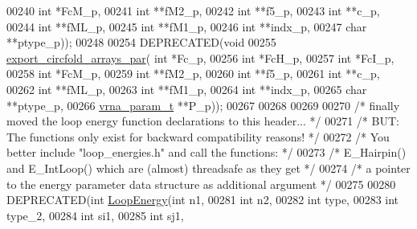 \begin{DoxyCode}
00240                         \textcolor{keywordtype}{int} *FcM\_p,
00241                         \textcolor{keywordtype}{int} **fM2\_p,
00242                         \textcolor{keywordtype}{int} **f5\_p,
00243                         \textcolor{keywordtype}{int} **c\_p,
00244                         \textcolor{keywordtype}{int} **fML\_p,
00245                         \textcolor{keywordtype}{int} **fM1\_p,
00246                         \textcolor{keywordtype}{int} **indx\_p,
00247                         \textcolor{keywordtype}{char} **ptype\_p));
00248 
00254 DEPRECATED(\textcolor{keywordtype}{void}
00255 \hyperlink{group__mfe__fold__single_ga004bb901e7fd2f8d5ae68f9530318ce1}{export\_circfold\_arrays\_par}( \textcolor{keywordtype}{int} *Fc\_p,
00256                             \textcolor{keywordtype}{int} *FcH\_p,
00257                             \textcolor{keywordtype}{int} *FcI\_p,
00258                             \textcolor{keywordtype}{int} *FcM\_p,
00259                             \textcolor{keywordtype}{int} **fM2\_p,
00260                             \textcolor{keywordtype}{int} **f5\_p,
00261                             \textcolor{keywordtype}{int} **c\_p,
00262                             \textcolor{keywordtype}{int} **fML\_p,
00263                             \textcolor{keywordtype}{int} **fM1\_p,
00264                             \textcolor{keywordtype}{int} **indx\_p,
00265                             \textcolor{keywordtype}{char} **ptype\_p,
00266                             \hyperlink{group__energy__parameters_structvrna__param__s}{vrna\_param\_t} **P\_p));
00267 
00268 
00269 
00270 \textcolor{comment}{/* finally moved the loop energy function declarations to this header...  */}
00271 \textcolor{comment}{/* BUT: The functions only exist for backward compatibility reasons!      */}
00272 \textcolor{comment}{/* You better include "loop\_energies.h" and call the functions:           */}
00273 \textcolor{comment}{/* E\_Hairpin() and E\_IntLoop() which are (almost) threadsafe as they get  */}
00274 \textcolor{comment}{/* a pointer to the energy parameter data structure as additional argument */}
00275 
00280 DEPRECATED(\textcolor{keywordtype}{int} \hyperlink{group__mfe__fold__single_ga2163034a25c6115d894b199e97e03f6c}{LoopEnergy}(\textcolor{keywordtype}{int} n1,
00281                           \textcolor{keywordtype}{int} n2,
00282                           \textcolor{keywordtype}{int} type,
00283                           \textcolor{keywordtype}{int} type\_2,
00284                           \textcolor{keywordtype}{int} si1,
00285                           \textcolor{keywordtype}{int} sj1,

\end{DoxyCode}
